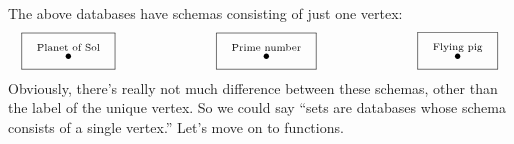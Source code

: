 \documentclass[7Sketches]{subfiles}
\begin{document}
The above databases have schemas consisting of just one vertex:
\[
\fbox{
\begin{tikzcd}[ampersand replacement=\&, column sep=50pt]
	\LTO{Planet of Sol}
\end{tikzcd}
}
\hspace{1in}
\fbox{
\begin{tikzcd}[ampersand replacement=\&, column sep=50pt]
	\LTO{Prime number}
\end{tikzcd}
}
\hspace{1in}
\fbox{
\begin{tikzcd}[ampersand replacement=\&, column sep=50pt]
	\LTO{Flying pig}
\end{tikzcd}
}
\]
Obviously, there's really not much difference between these schemas, other than the label of the unique vertex. So we could say ``sets are databases whose schema consists of a single vertex.'' Let's move on to functions.
\end{document}
